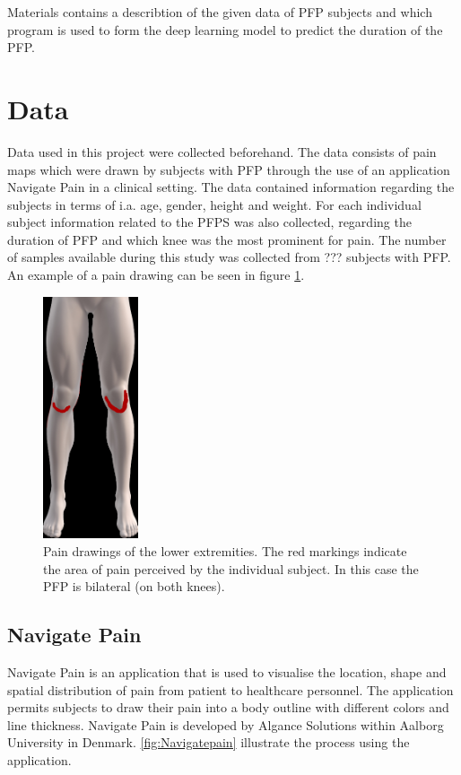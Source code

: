 Materials contains a describtion of the given data of PFP subjects and which program is used to form the deep learning model to predict the duration of the PFP. 

\section{Data}
Data used in this project were collected beforehand. The data consists of pain maps which were drawn by subjects with PFP through the use of an application Navigate Pain in a clinical setting. The data contained information regarding the subjects in terms of i.a. age, gender, height and weight. For each individual subject information related to the PFPS was also collected, regarding the duration of PFP and which knee was the most prominent for pain. 
The number of samples available during this study was collected from ??? subjects with PFP. An example of a pain drawing can be seen in figure \ref{fig:kneepainmap}. 

\begin{figure} [H]
\centering
\includegraphics[width=0.25\textwidth]{figures/kneepainmap}
\caption{Pain drawings of the lower extremities. The red markings indicate the area of pain perceived by the individual subject. In this case the PFP is bilateral (on both knees).}
\label{fig:kneepainmap}
\end{figure}

\subsection{Navigate Pain}
Navigate Pain is an application that is used to visualise the location, shape and spatial distribution of pain from patient to healthcare personnel. The application permits subjects to draw their pain into a body outline with different colors and line thickness. Navigate Pain is developed by Algance Solutions within Aalborg University in Denmark.\citep{Solutions2015}
\autoref{fig:Navigatepain} illustrate the process using the application.


